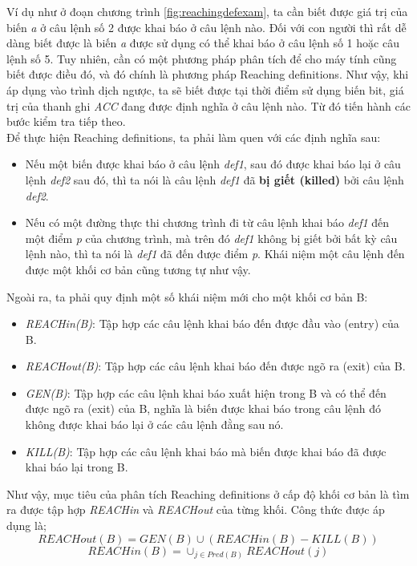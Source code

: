 Ví dụ như ở đoạn chương trình \ref{fig:reachingdefexam}, ta cần biết được giá trị của biến \textit{a} ở câu lệnh số 2 được khai báo ở câu lệnh nào. Đối với con người thì rất dễ dàng biết được là biến \textit{a} được sử dụng có thể khai báo ở câu lệnh số 1 hoặc câu lệnh số 5. Tuy nhiên, cần có một phương pháp phân tích để cho máy tính cũng biết được điều đó, và đó chính là phương pháp Reaching definitions. Như vậy, khi áp dụng vào trình dịch ngược, ta sẽ biết được tại thời điểm sử dụng biến bit, giá trị của thanh ghi \textit{ACC} đang được định nghĩa ở câu lệnh nào. Từ đó tiến hành các bước kiểm tra tiếp theo. \\

Để thực hiện Reaching definitions, ta phải làm quen với các định nghĩa sau:
\begin{itemize}
	\item Nếu một biến được khai báo ở câu lệnh \textit{def1}, sau đó được khai báo lại ở câu lệnh \textit{def2} sau đó, thì ta nói là câu lệnh \textit{def1} đã \textbf{bị giết (killed)} bởi câu lệnh \textit{def2}.
	\item Nếu có một đường thực thi chương trình đi từ câu lệnh khai báo \textit{def1} đến một điểm \textit{p} của chương trình, mà trên đó \textit{def1} không bị giết bởi bất kỳ câu lệnh nào, thì ta nói là \textit{def1} đã đến được điểm \textit{p}. Khái niệm một câu lệnh đến được một khối cơ bản cũng tương tự như vậy.
\end{itemize}

Ngoài ra, ta phải quy định một số khái niệm mới cho một khối cơ bản B:
\begin{itemize}
	\item \textit{REACHin(B)}: Tập hợp các câu lệnh khai báo đến được đầu vào (entry) của B.
	\item \textit{REACHout(B)}: Tập hợp các câu lệnh khai báo đến được ngõ ra (exit) của B.
	\item \textit{GEN(B)}: Tập hợp các câu lệnh khai báo xuất hiện trong B và có thể đến được ngõ ra (exit) của B, nghĩa là biến được khai báo trong câu lệnh đó không được khai báo lại ở các câu lệnh đằng sau nó.
	\item \textit{KILL(B)}: Tập hợp các câu lệnh khai báo mà biến được khai báo đã được khai báo lại trong B.
\end{itemize}

Như vậy, mục tiêu của phân tích Reaching definitions ở cấp độ khối cơ bản là tìm ra được tập hợp \textit{REACHin} và \textit{REACHout} của từng khối. Công thức được áp dụng là;
\begin{equation} \label{eq:reachout}
	REACHout(B) = GEN(B) \cup (REACHin(B)-KILL(B))
\end{equation}	
\begin{equation} \label{eq:reachin}
REACHin(B) = \cup_{j \in Pred(B)} REACHout(j)
\end{equation}	


